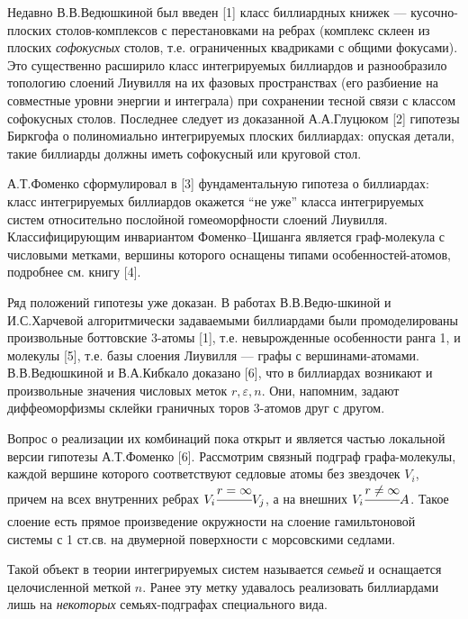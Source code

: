 \documentclass{vzmsthesis}
\begin{document}

\vzmscaption

Недавно В.В.Ведюшкиной был введен [1] класс биллиардных книжек --- кусочно-плоских столов-комплексов с перестановками на ребрах (комплекс склеен из плоских \textit{софокусных} столов, т.е. ограниченных квадриками с общими фокусами). Это существенно расширило класс интегрируемых биллиардов и разнообразило топологию слоений Лиувилля на их фазовых пространствах (его разбиение на совместные уровни энергии и интеграла) при сохранении тесной связи с классом софокусных столов. Последнее следует из доказанной А.А.Глуцюком [2] гипотезы Биркгофа о полиномиально интегрируемых плоских биллиардах: опуская детали, такие биллиарды должны иметь  софокусный или круговой стол. 

А.Т.Фоменко сформулировал в [3] фундаментальную гипотеза о биллиардах:  класс интегрируемых биллиардов окажется ``не уже'' класса интегрируемых систем относительно послойной гомеоморфности слоений Лиувилля. Классифицирующим инвариантом Фоменко--Цишанга является граф-молекула с числовыми метками, вершины которого оснащены типами особенностей-атомов, подробнее см. книгу [4].

Ряд положений гипотезы уже доказан. В работах В.В.Ведю-шкиной и И.С.Харчевой алгоритмически задаваемыми биллиардами были промоделированы произвольные боттовские 3-атомы [1], т.е. невырожденные особенности ранга 1, и молекулы [5], т.е. базы слоения Лиувилля --- графы с вершинами-атомами. В.В.Ведюшкиной и В.А.Кибкало доказано [6], что в биллиардах возникают и произвольные значения числовых меток $r, \varepsilon, n$. Они, напомним, задают диффеоморфизмы склейки граничных торов 3-атомов друг с другом. 

Вопрос о реализации их комбинаций пока открыт и является частью локальной версии гипотезы А.Т.Фоменко [6]. Рассмотрим связный подграф графа-молекулы, каждой вершине которого соответствуют седловые атомы без звездочек $V_i$, причем на всех внутренних ребрах $V_i \cfrac{r = \infty}{}V_j$, а на внешних $V_i \cfrac{r \ne \infty}{}A$. Такое слоение есть прямое произведение окружности на слоение гамильтоновой системы с 1 ст.св. на двумерной поверхности с морсовскими седлами. 

Такой объект в теории интегрируемых систем называется \textit{семьей} и оснащается целочисленной меткой $n$. Ранее эту метку удавалось реализовать биллиардами лишь на \textit{некоторых} семьях-подграфах специального вида. %
 
\end{document}
